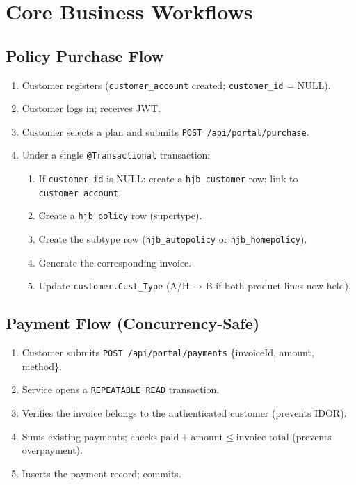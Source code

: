 \documentclass[12pt,letterpaper]{article}
\begin{document}
\section{Core Business Workflows}

\subsection{Policy Purchase Flow}

\begin{enumerate}
  \item Customer registers (\texttt{customer\_account} created; \texttt{customer\_id} = NULL).
  \item Customer logs in; receives JWT.
  \item Customer selects a plan and submits \texttt{POST /api/portal/purchase}.
  \item Under a single \texttt{@Transactional} transaction:
    \begin{enumerate}
      \item If \texttt{customer\_id} is NULL: create a \texttt{hjb\_customer} row; link to \texttt{customer\_account}.
      \item Create a \texttt{hjb\_policy} row (supertype).
      \item Create the subtype row (\texttt{hjb\_autopolicy} or \texttt{hjb\_homepolicy}).
      \item Generate the corresponding invoice.
      \item Update \texttt{customer.Cust\_Type} (A/H → B if both product lines now held).
    \end{enumerate}
\end{enumerate}

\subsection{Payment Flow (Concurrency-Safe)}

\begin{enumerate}
  \item Customer submits \texttt{POST /api/portal/payments} \{invoiceId, amount, method\}.
  \item Service opens a \texttt{REPEATABLE\_READ} transaction.
  \item Verifies the invoice belongs to the authenticated customer (prevents IDOR).
  \item Sums existing payments; checks \(\text{paid} + \text{amount} \le \text{invoice total}\) (prevents overpayment).
  \item Inserts the payment record; commits.
\end{enumerate}
\end{document}
